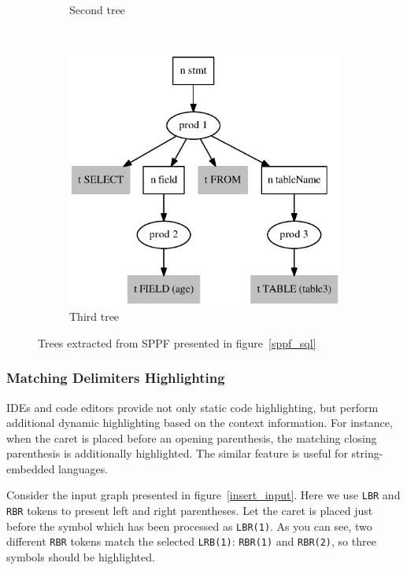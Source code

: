 \documentclass{acm_proc_article-sp}
\begin{document}
\begin{figure}[h!]
\begin{center}
\begin{subfigure}{0.2\textwidth}
    	\caption{Second tree}
    	\label{tree_sql_22}
    \end{subfigure}
    \\
    \begin{subfigure}{0.2\textwidth}      
       \includegraphics[scale=0.3]{graphs/SQL_sppf_static_tree3.eps}
    
    	\caption{Third tree}
    	\label{tree_sql_33}
    \end{subfigure}        
    \caption{Trees extracted from SPPF presented in figure~\ref{sppf_sql} }
    \label{trees_sql}
  \end{center}
\end{figure}

\subsubsection{Matching Delimiters Highlighting}

IDEs and code editors provide not only static code highlighting, but perform additional dynamic highlighting based on the context information. For instance, when the caret is placed before an opening parenthesis, the matching closing parenthesis is additionally highlighted. The similar feature is useful for string-embedded languages.

Consider the input graph presented in figure~\ref{insert_input}. Here we use \verb|LBR| and \verb|RBR| tokens to present left and right parentheses. Let the caret is placed just before the symbol which has been processed as \verb|LBR(1)|. As you can see, two different \verb|RBR| tokens match the selected \verb|LRB(1)|: \verb|RBR(1)| and \verb|RBR(2)|, so three symbols should be highlighted.  
\end{document}
